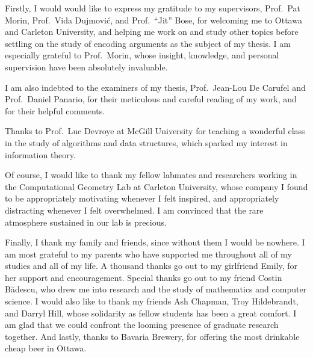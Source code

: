 Firstly, I would would like to express my gratitude to my supervisors,
Prof.~Pat Morin, Prof.~Vida Dujmovi\'{c}, and Prof.~``Jit'' Bose, for
welcoming me to Ottawa and Carleton University, and helping me work on
and study other topics before settling on the study of encoding
arguments as the subject of my thesis. I am especially grateful to
Prof.~Morin, whose insight, knowledge, and personal supervision have
been absolutely invaluable.

I am also indebted to the examiners of my thesis, Prof.~Jean-Lou De
Carufel and Prof.~Daniel Panario, for their meticulous and careful
reading of my work, and for their helpful comments.

Thanks to Prof.~Luc Devroye at McGill University for teaching a
wonderful class in the study of algorithms and data structures, which
sparked my interest in information theory.

Of course, I would like to thank my fellow labmates and researchers
working in the Computational Geometry Lab at Carleton University,
whose company I found to be appropriately motivating whenever I felt
inspired, and appropriately distracting whenever I felt overwhelmed. I
am convinced that the rare atmosphere sustained in our lab is
precious.

Finally, I thank my family and friends, since without them I would be
nowhere. I am most grateful to my parents who have supported me
throughout all of my studies and all of my life. A thousand thanks go
out to my girlfriend Emily, for her support and encouragement. Special
thanks go out to my friend Costin B\u{a}descu, who drew me into
research and the study of mathematics and computer science. I would
also like to thank my friends Ash Chapman, Troy Hildebrandt, and
Darryl Hill, whose solidarity as fellow students has been a great
comfort. I am glad that we could confront the looming presence of
graduate research together. And lastly, thanks to Bavaria Brewery, for
offering the most drinkable cheap beer in Ottawa.

